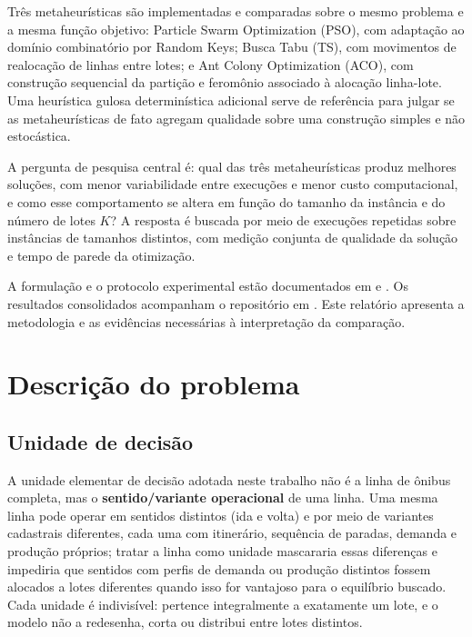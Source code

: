 \documentclass[12pt,a4paper]{article}
\begin{document}
Três metaheurísticas são implementadas e comparadas sobre o mesmo problema e
a mesma função objetivo: Particle Swarm Optimization (PSO), com adaptação ao
domínio combinatório por Random Keys; Busca Tabu (TS), com movimentos de
realocação de linhas entre lotes; e Ant Colony Optimization (ACO), com
construção sequencial da partição e feromônio associado à alocação
linha-lote. Uma heurística gulosa determinística adicional serve de
referência para julgar se as metaheurísticas de fato agregam qualidade sobre
uma construção simples e não estocástica.

A pergunta de pesquisa central é: qual das três metaheurísticas produz
melhores soluções, com menor variabilidade entre execuções e menor custo
computacional, e como esse comportamento se altera em função do tamanho da
instância e do número de lotes \(K\)? A resposta é buscada por meio de
execuções repetidas sobre instâncias de tamanhos distintos, com medição
conjunta de qualidade da solução e tempo de parede da otimização.

A formulação e o protocolo experimental estão documentados em
 e . Os resultados
consolidados acompanham o repositório em . Este relatório
apresenta a metodologia e as evidências necessárias à interpretação da comparação.

\section{Descrição do problema}
\label{sec:problema}

\subsection{Unidade de decisão}

A unidade elementar de decisão adotada neste trabalho não é a linha de
ônibus completa, mas o \textbf{sentido/variante operacional} de uma linha.
Uma mesma linha pode operar em sentidos distintos (ida e volta) e por meio
de variantes cadastrais diferentes, cada uma com itinerário, sequência de
paradas, demanda e produção próprios; tratar a linha como unidade
mascararia essas diferenças e impediria que sentidos com perfis de
demanda ou produção distintos fossem alocados a lotes diferentes quando
isso for vantajoso para o equilíbrio buscado. Cada unidade é indivisível:
pertence integralmente a exatamente um lote, e o modelo não a redesenha,
corta ou distribui entre lotes distintos.
\end{document}
